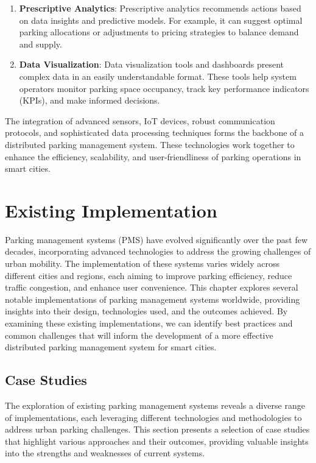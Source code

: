 \documentclass[oneside, 12pt, a4paper, draft]{book}
\begin{document}
\begin{enumerate}
\begin{enumerate}
\item \textbf{Prescriptive Analytics}: Prescriptive analytics recommends actions based on data insights and predictive models. For example, it can suggest optimal parking allocations or adjustments to pricing strategies to balance demand and supply.

\item \textbf{Data Visualization}: Data visualization tools and dashboards present complex data in an easily understandable format. These tools help system operators monitor parking space occupancy, track key performance indicators (KPIs), and make informed decisions.
\end{enumerate}

The integration of advanced sensors, IoT devices, robust communication protocols, and sophisticated data processing techniques forms the backbone of a distributed parking management system. These technologies work together to enhance the efficiency, scalability, and user-friendliness of parking operations in smart cities.
\end{enumerate}
\chapter{Existing Implementation}
\label{sec:orgb55f8df}
Parking management systems (PMS) have evolved significantly over the past few decades, incorporating advanced technologies to address the growing challenges of urban mobility. The implementation of these systems varies widely across different cities and regions, each aiming to improve parking efficiency, reduce traffic congestion, and enhance user convenience. This chapter explores several notable implementations of parking management systems worldwide, providing insights into their design, technologies used, and the outcomes achieved. By examining these existing implementations, we can identify best practices and common challenges that will inform the development of a more effective distributed parking management system for smart cities.
\section{Case Studies}
\label{sec:org22244ba}

The exploration of existing parking management systems reveals a diverse range of implementations, each leveraging different technologies and methodologies to address urban parking challenges. This section presents a selection of case studies that highlight various approaches and their outcomes, providing valuable insights into the strengths and weaknesses of current systems.
\end{document}
